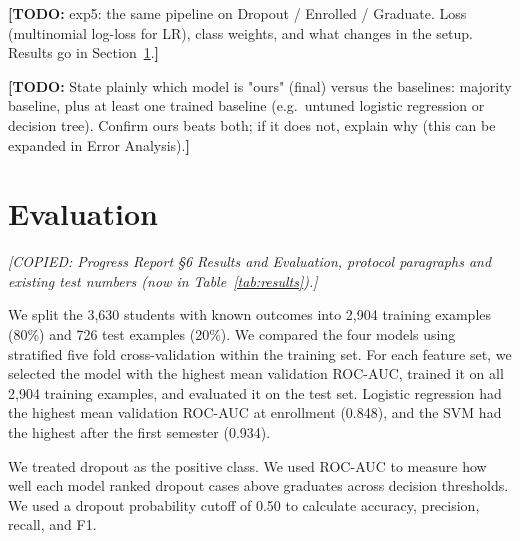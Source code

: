 \documentclass[11pt]{article}
\newcommand{\todo}[1]{{\color{red}\textbf{[TODO:} #1\textbf{]}}}
\newcommand{\copynote}[1]{{\color{blue}\textit{[COPIED: #1]}}}
\newcommand{\todo}[1]{}
\newcommand{\copynote}[1]{}
\begin{document}
\todo{exp5: the same pipeline on Dropout / Enrolled / Graduate. Loss (multinomial log-loss for LR), class weights, and what changes in the setup. Results go in Section~\ref{sec:evaluation}.}

\todo{State plainly which model is "ours" (final) versus the baselines: majority baseline, plus at least one trained baseline (e.g.\ untuned logistic regression or decision tree). Confirm ours beats both; if it does not, explain why (this can be expanded in Error Analysis).}

\section{Evaluation}\label{sec:evaluation}
\copynote{Progress Report \S6 Results and Evaluation, protocol paragraphs and existing test numbers (now in Table~\ref{tab:results}).}

We split the 3,630 students with known outcomes into 2,904 training examples (80\%) and 726 test examples (20\%). We compared the four models using stratified five fold cross-validation within the training set. For each feature set, we selected the model with the highest mean validation ROC-AUC, trained it on all 2,904 training examples, and evaluated it on the test set. Logistic regression had the highest mean validation ROC-AUC at enrollment (0.848), and the SVM had the highest after the first semester (0.934).

We treated dropout as the positive class. We used ROC-AUC to measure how well each model ranked dropout cases above graduates across decision thresholds. We used a dropout probability cutoff of 0.50 to calculate accuracy, precision, recall, and F1.
\end{document}
